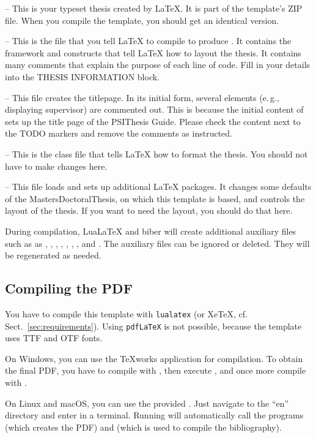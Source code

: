  -- This is your typeset thesis created by LaTeX. It is part of the template's ZIP file. When you compile the template, you should get an identical version.

 -- This is the file that you tell LaTeX to compile to produce . It contains the framework and constructs that tell LaTeX how to layout the thesis. It contains many comments that explain the purpose of each line of code. Fill in your details into the THESIS INFORMATION block.

 -- This file creates the titlepage. In its initial form, several elements (e.\,g., displaying supervisor) are commented out. This is because the initial content of  sets up the title page of the PSIThesis Guide. Please check the content next to the TODO markers and remove the comments as instructed.

 -- This is the class file that tells LaTeX how to format the thesis. You should not have to make changes here.

 -- This file loads and sets up additional LaTeX packages. It changes some defaults of the MastersDoctoralThesis, on which this template is based, and controls the layout of the thesis. If you want to need the layout, you should do that here.

During compilation, LuaLaTeX and biber will create additional auxiliary files such as as
, , , ,
, , , and .
The auxiliary files can be ignored or deleted. They will be regenerated  as needed.


\subsection{Compiling the PDF}
\label{sec:compile}

You have to compile this template with \texttt{lualatex} (or XeTeX, cf. Sect.~\ref{sec:requirements}). Using \texttt{pdfLaTeX} is not possible, because the template uses TTF and OTF fonts.

On Windows, you can use the TeXworks application for compilation. To obtain the final PDF, you have to compile  with , then execute , and once more compile  with .

On Linux and macOS, you can use the provided .
Just navigate to the ``en'' directory and enter  in a terminal. Running  will automatically call the programs  (which creates the PDF) and  (which is used to compile the bibliography).

